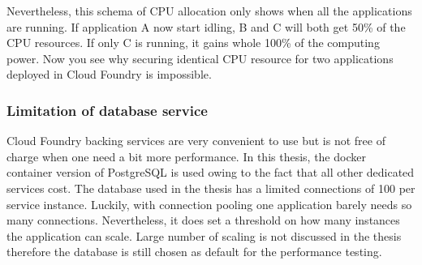 Nevertheless, this schema of CPU allocation only shows when all the applications are running. If application A now start idling, B and C will both get 50\% of the CPU resources. If only C is running, it gains whole 100\% of the computing power. Now you see why securing identical CPU resource for two applications deployed in Cloud Foundry is impossible. \\
\subsubsection{Limitation of database service}
Cloud Foundry backing services are very convenient to use but is not free of charge when one need a bit more performance. In this thesis, the docker container version of PostgreSQL is used owing to the fact that all other dedicated services cost. The database used in the thesis has a limited connections of 100 per service instance. Luckily,  with connection pooling one application barely needs so many connections. Nevertheless, it does set a threshold on how many instances the application can scale. Large number of scaling is not discussed in the thesis therefore the database is still chosen as default for the performance testing. \\

